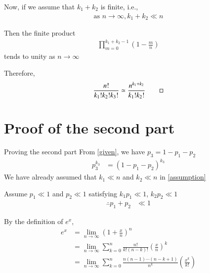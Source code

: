 \documentclass{beamer}
\providecommand{\brak}[1]{\ensuremath{\left(#1\right)}}
\begin{document}
	\begin{frame}
	Now, if we assume that $k_1 + k_2$ is finite, i.e.,
	\begin{align}
		\label{assumption}
		\text{as } n \to \infty, k_1 + k_2 \ll n
	\end{align}
	
	Then the finite product
	\begin{align}
		\prod_{m=0}^{k_1 + k_2 - 1} \brak{1 - \frac{m}{n}} 
	\end{align}
	tends to unity as $n \to \infty$
	
	\begin{block}{}
	Therefore,
		\begin{align}
			\frac{n!}{k_1! k_2! k_3!} \simeq \frac{n^{k_1 + k_2}}{k_1! k_2!} \qed
		\end{align}
	\end{block}
	\end{frame}

	\section{Proof of the second part}
	\begin{frame}{Proving the second part}
	From \eqref{given}, we have $p_3 = 1 - p_1 - p_2$
	\begin{align}
		p_3^{k_3} &= (1 - p_1 - p_2)^{k_3}
	\end{align}
	We have already assumed that $k_1 \ll n$ and $k_2 \ll n$ in \eqref{assumption}
	
	Assume $p_1 \ll 1$ and $p_2 \ll 1$ satisfying $k_1 p_1 \ll 1$,  $k_2 p_2 \ll 1$
	\begin{align}
		\therefore p_1 + p_2 &\ll 1
	\end{align}
	
	By the definition of $e^x$,
	\begin{align}
		e^x &= \lim_{n \to \infty} \brak{1 + \frac{x}{n}}^n \\
		&= \lim_{n \to \infty} \sum_{k=0}^n \frac{n!}{k! (n-k)!} \brak{\frac{x}{n}}^k \\
		&= \lim_{n \to \infty} \sum_{k=0}^n \frac{n (n-1) \cdots (n-k+1)}{n^k} \brak{\frac{x^k}{k!}}  \\
	\end{align}
	\end{frame}
	
\end{document}

